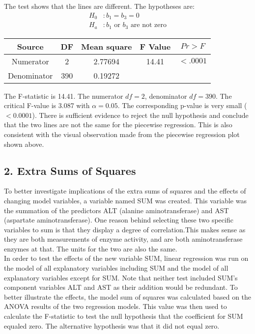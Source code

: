 \documentclass{article}
\begin{document}
The test shows that the lines are different.
The hypotheses are:
\begin{align*}
H_0&: b_1=b_3=0\\
H_a&: \text{$b_1$ or $b_3$ are not zero}
\end{align*}

\begin{minipage}{\textwidth}
\centering
{}
\begin{tabular}{c | c | c | c | c}
\hline
Source&	DF	&Mean square	&F Value	& $Pr>F$ \\
\hline
Numerator&	2&	2.77694	&14.41	& $<.0001$\\
\hline
Denominator	&390	&0.19272	 	 & & \\
\hline
\end{tabular}
\end{minipage} \hfill

The F-statistic is 14.41. The numerator $df =2$, denominator $df =390$. The critical F-value is 3.087 with $\alpha = 0.05$. The corresponding p-value is very small ($<0.0001$). There is sufficient evidence to reject the null hypothesis and conclude that the two lines are not the same for the piecewise regression. This is also consistent with the visual observation made from the piecewise regression plot shown above.

\subsection{2. Extra Sums of Squares}

To better investigate implications of the extra sums of squares and the effects of changing model variables, a variable named SUM was created. This variable was the summation of the predictors ALT (alanine aminotransferase) and AST (aspartate aminotransferase). One reason behind selecting these two specific variables to sum is that they display a degree of correlation.This makes sense as they are both measurements of enzyme activity, and are both aminotransferase enzymes at that. The units for the two are also the same. \\

In order to test the effects of the new variable SUM, linear regression was run on the model of all explanatory variables including SUM and the model of all explanatory variables except for SUM. Note that neither test included SUM's component variables ALT and AST as their addition would be redundant. To better illustrate the effects, the model sum of squares was calculated based on the ANOVA results of the two regression models. This value was then used to calculate the F-statistic to test the null hypothesis that the coefficient for SUM equaled zero. The alternative hypothesis was that it did not equal zero.
\end{document}
